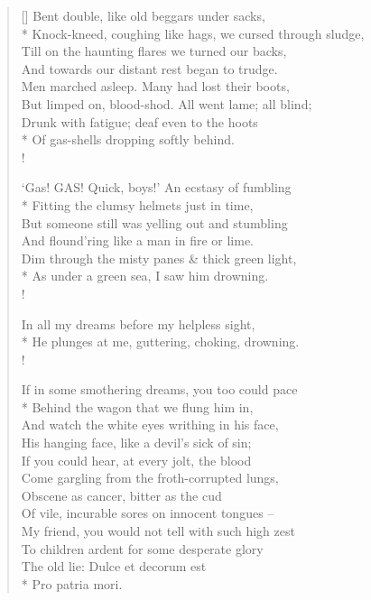 \documentclass[MAIN]{subfiles}
\begin{document}
\settowidth{\versewidth}{Knock-kneed, coughing like hags, we cursed through sludge,}
\begin{verse}[\versewidth]
Bent double, like old beggars under sacks,\\*
Knock-kneed, coughing like hags, we cursed through sludge,\\
Till on the haunting flares we turned our backs,\\
And towards our distant rest began to trudge.\\
Men marched asleep. Many had lost their boots,\\
But limped on, blood-shod. All went lame; all blind;\\
Drunk with fatigue; deaf even to the hoots\\*
Of gas-shells dropping softly behind.\\!

`Gas! GAS! Quick, boys!' An ecstasy of fumbling\\*
Fitting the clumsy helmets just in time,\\
But someone still was yelling out and stumbling\\
And flound'ring like a man in fire or lime.\\
Dim through the misty panes \& thick green light,\\*
As under a green sea, I saw him drowning.\\!

In all my dreams before my helpless sight,\\*
He plunges at me, guttering, choking, drowning.\\!

If in some smothering dreams, you too could pace\\*
Behind the wagon that we flung him in,\\
And watch the white eyes writhing in his face,\\
His hanging face, like a devil's sick of sin;\\
If you could hear, at every jolt, the blood\\
Come gargling from the froth-corrupted lungs,\\
Obscene as cancer, bitter as the cud\\
Of vile, incurable sores on innocent tongues --\\
My friend, you would not tell with such high zest\\
To children ardent for some desperate glory\\
The old lie: {\hge Dulce et decorum est\\*
Pro patria mori}.
\end{verse}
\end{document}
